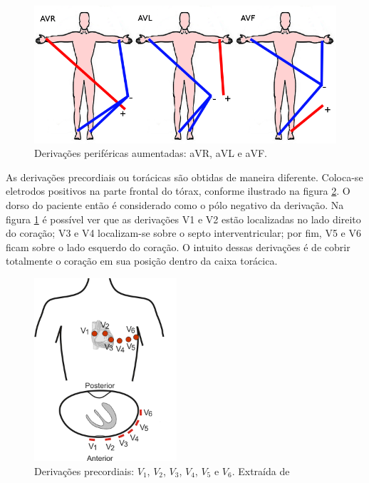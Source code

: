 \begin{figure}[ht!]
 \centering
 \includegraphics[width=400pt]{figures/chap2-aleads.png}
 \caption[Derivações periféricas aumentadas: aVR, aVL e aVF]{Derivações periféricas aumentadas: aVR, aVL e aVF.}
 \label{fig:aleads}
\end{figure}

As derivações precordiais ou torácicas são obtidas de maneira diferente. Coloca-se eletrodos positivos na parte frontal do tórax, conforme ilustrado na figura \ref{fig:vleads}. O dorso do paciente então é considerado como o pólo negativo da derivação. Na figura \ref{fig:aleads} é possível ver que as derivações V1 e V2 estão localizadas no lado direito do coração; V3 e V4 localizam-se sobre o septo interventricular; por fim, V5 e V6 ficam sobre o lado esquerdo do coração. O intuito dessas derivações é de cobrir totalmente o coração em sua posição dentro da caixa torácica.

\begin{figure}[ht!]
 \centering
 \includegraphics[width=150pt]{figures/chap2-vleads.png}
 \caption[Derivações precordiais: $V_1$, $V_2$, $V_3$, $V_4$, $V_5$ e $V_6$]{Derivações precordiais: $V_1$, $V_2$, $V_3$, $V_4$, $V_5$ e $V_6$. Extraída de \cite{Klabunde2008}}
 \label{fig:vleads}
\end{figure}

